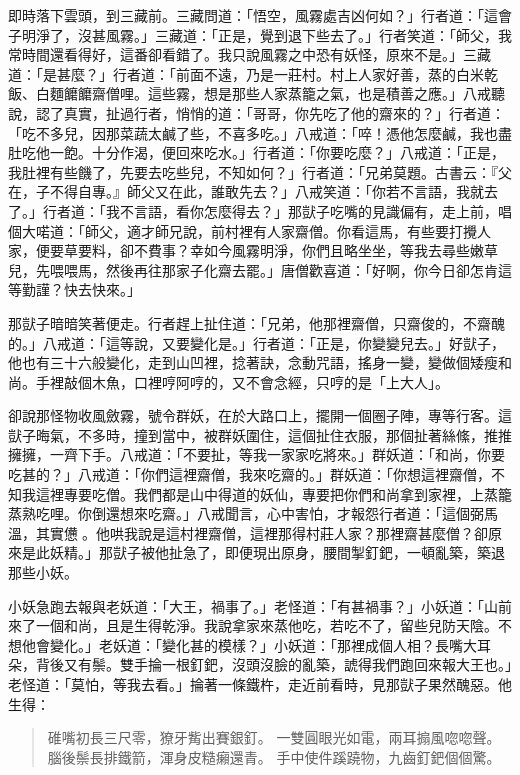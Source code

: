 即時落下雲頭，到三藏前。三藏問道：「悟空，風霧處吉凶何如？」行者道：「這會子明淨了，沒甚風霧。」三藏道：「正是，覺到退下些去了。」行者笑道：「師父，我常時間還看得好，這番卻看錯了。我只說風霧之中恐有妖怪，原來不是。」三藏道：「是甚麼？」行者道：「前面不遠，乃是一莊村。村上人家好善，蒸的白米乾飯、白麵饝饝齋僧哩。這些霧，想是那些人家蒸籠之氣，也是積善之應。」八戒聽說，認了真實，扯過行者，悄悄的道：「哥哥，你先吃了他的齋來的？」行者道：「吃不多兒，因那菜蔬太鹹了些，不喜多吃。」八戒道：「啐！憑他怎麼鹹，我也盡肚吃他一飽。十分作渴，便回來吃水。」行者道：「你要吃麼？」八戒道：「正是，我肚裡有些饑了，先要去吃些兒，不知如何？」行者道：「兄弟莫題。古書云：『父在，子不得自專。』師父又在此，誰敢先去？」八戒笑道：「你若不言語，我就去了。」行者道：「我不言語，看你怎麼得去？」那獃子吃嘴的見識偏有，走上前，唱個大喏道：「師父，適才師兄說，前村裡有人家齋僧。你看這馬，有些要打攪人家，便要草要料，卻不費事？幸如今風霧明淨，你們且略坐坐，等我去尋些嫩草兒，先喂喂馬，然後再往那家子化齋去罷。」唐僧歡喜道：「好啊，你今日卻怎肯這等勤謹？快去快來。」

那獃子暗暗笑著便走。行者趕上扯住道：「兄弟，他那裡齋僧，只齋俊的，不齋醜的。」八戒道：「這等說，又要變化是。」行者道：「正是，你變變兒去。」好獃子，他也有三十六般變化，走到山凹裡，捻著訣，念動咒語，搖身一變，變做個矮瘦和尚。手裡敲個木魚，口裡哼阿哼的，又不會念經，只哼的是「上大人」。

卻說那怪物收風斂霧，號令群妖，在於大路口上，擺開一個圈子陣，專等行客。這獃子晦氣，不多時，撞到當中，被群妖圍住，這個扯住衣服，那個扯著絲絛，推推擁擁，一齊下手。八戒道：「不要扯，等我一家家吃將來。」群妖道：「和尚，你要吃甚的？」八戒道：「你們這裡齋僧，我來吃齋的。」群妖道：「你想這裡齋僧，不知我這裡專要吃僧。我們都是山中得道的妖仙，專要把你們和尚拿到家裡，上蒸籠蒸熟吃哩。你倒還想來吃齋。」八戒聞言，心中害怕，才報怨行者道：「這個弼馬溫，其實憊𪬯。他哄我說是這村裡齋僧，這裡那得村莊人家？那裡齋甚麼僧？卻原來是此妖精。」那獃子被他扯急了，即便現出原身，腰間掣釘鈀，一頓亂築，築退那些小妖。

小妖急跑去報與老妖道：「大王，禍事了。」老怪道：「有甚禍事？」小妖道：「山前來了一個和尚，且是生得乾淨。我說拿家來蒸他吃，若吃不了，留些兒防天陰。不想他會變化。」老妖道：「變化甚的模樣？」小妖道：「那裡成個人相？長嘴大耳朵，背後又有鬃。雙手掄一根釘鈀，沒頭沒臉的亂築，諕得我們跑回來報大王也。」老怪道：「莫怕，等我去看。」掄著一條鐵杵，走近前看時，見那獃子果然醜惡。他生得：
\begin{quote}
碓嘴初長三尺零，獠牙觜出賽銀釘。
一雙圓眼光如電，兩耳搧風唿唿聲。
腦後鬃長排鐵箭，渾身皮糙癩還青。
手中使件蹊蹺物，九齒釘鈀個個驚。
\end{quote}

